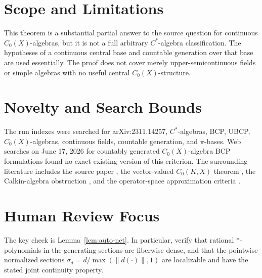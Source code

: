 \documentclass[11pt]{article}
\begin{document}
\section*{Scope and Limitations}

This theorem is a substantial partial answer to the source question for
continuous \(C_0(X)\)-algebras, but it is not a full arbitrary \(C^*\)-algebra
classification.  The hypotheses of a continuous central base and countable
generation over that base are used essentially.  The proof does not cover
merely upper-semicontinuous fields or simple algebras with no useful central
\(C_0(X)\)-structure.

\section*{Novelty and Search Bounds}

The run indexes were searched for arXiv:2311.14257, \(C^*\)-algebras, BCP,
UBCP, \(C_0(X)\)-algebras, continuous fields, countable generation, and
\(\pi\)-bases.  Web searches on June 17, 2026 for countably generated
\(C_0(X)\)-algebra BCP formulations found no exact existing version of this
criterion.  The surrounding literature includes the source paper \cite{HKL},
the vector-valued \(C_0(K,X)\) theorem \cite{LLLZ}, the Calkin-algebra
obstruction \cite{BLS}, and the operator-space approximation criteria
\cite{BLS2}.

\section*{Human Review Focus}

The key check is Lemma~\ref{lem:auto-net}.  In particular, verify that
rational \(*\)-polynomials in the generating sections are fiberwise dense, and
that the pointwise normalized sections \(\sigma_d=d/\max(\|d(\cdot)\|,1)\)
are localizable and have the stated joint continuity property.
\end{document}
